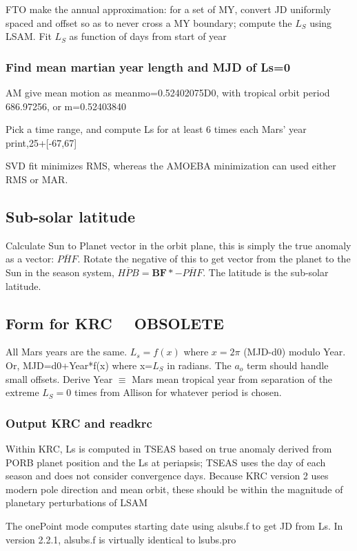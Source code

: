 \documentclass[draft]{article}
\newcommand{\qv}{\overline}       %
\begin{document}
FTO make the annual approximation: for a set of MY, convert JD uniformly spaced
and offset so as to never cross a MY boundary; compute the $L_S$ using LSAM.
Fit $L_S$ as function of days from start of year

\subsubsection{Find mean martian year length and MJD of Ls=0}

AM give mean motion as meanmo=0.52402075D0, with tropical orbit period  686.97256, or m=0.52403840 

Pick a time range, and compute Ls for at least 6 times each Mars' year 
\\ print,25+[-67,67]

SVD fit minimizes RMS, whereas the AMOEBA minimization can used either RMS or MAR.   

\subsection{Sub-solar latitude} 
Calculate Sun to Planet vector in the orbit plane, this is simply the true
anomaly as a vector: $\qv{PHF} $. Rotate the negative of this to get vector from
the planet to the Sun in the season system, $ \qv{HPB}= \mathbf{BF} \ast
-\qv{PHF} $. The latitude is the sub-solar latitude.

\subsection{Form for KRC  \ \ OBSOLETE}
All Mars years are the same. $L_s = f(x)$ where $x=2 \pi$ (MJD-d0) modulo
Year. Or, MJD=d0+Year*f(x) where x=$L_S$ in radians. The $a_o$ term should
handle small offsets. Derive Year $\equiv$ Mars mean tropical year from
separation of the extreme $L_S=0$ times from Allison for whatever period is
chosen.
\subsubsection{Output KRC and readkrc}
Within KRC, Ls is computed in TSEAS based on true anomaly derived from PORB
planet position and the Ls at periapsis; TSEAS uses the day of each season and
does not consider convergence days. Because KRC version 2 uses modern pole
direction and mean orbit, these should be within the magnitude of planetary
perturbations of LSAM

The onePoint mode computes starting date using alsubs.f to get JD from Ls.
In version 2.2.1, alsubs.f is virtually identical to lsubs.pro
\end{document}
